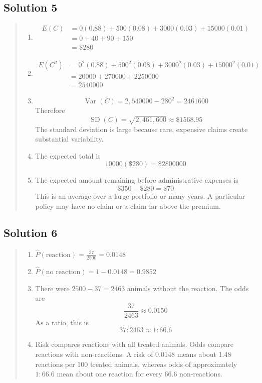 \documentclass[10pt,letterpaper]{article}
\newcommand{\solutionheading}[1]{%
  \subsection*{Solution #1}
}
\newenvironment{answer}{%
  \begin{quote}\small\color{black}
}{%
  \end{quote}
}
\begin{document}
\solutionheading{5}
\begin{answer}
\begin{enumerate}
	\item
	$$
	\begin{aligned}
	E(C) 	&=0(0.88)+500(0.08)+3000(0.03)+15000(0.01)\\
        		&=0+40+90+150\\
  		&=\$280
	\end{aligned}
	$$	
	\item
	$$
	\begin{aligned}
	E(C^2)
	&=0^2(0.88)+500^2(0.08)+3000^2(0.03)+15000^2(0.01)\\
	&=20000+270000+2250000\\
	&=2540000
	\end{aligned}
	 $$
	\item 
	$$\operatorname{Var}(C)=2{,}540000-280^2=2461600$$
	Therefore
	$$\operatorname{SD}(C)=\sqrt{2{,}461{,}600}\approx\$1568.95$$
	The standard deviation is large because rare, expensive claims create substantial variability.
	\item The expected total is
	$$10000(\$280)=\$2800000$$
	\item The expected amount remaining before administrative expenses is
	$$\$350-\$280=\$70$$
	This is an average over a large portfolio or many years. A particular policy may have no claim or a claim far above the premium.
\end{enumerate}
\end{answer}

\solutionheading{6}
\begin{answer}
\begin{enumerate}
	\item $\widehat{P}(\text{reaction})=\frac{37}{2500}=0.0148$	
	\item $\widehat{P}(\text{no reaction})=1-0.0148=0.9852$
  	\item There were $2500-37=2463$ animals without the reaction. The odds are
	$$\frac{37}{2463}\approx0.0150$$
  	As a ratio, this is
	$$37:2463\approx1:66.6$$
  	\item Risk compares reactions with all treated animals. Odds compare reactions with non-reactions. A risk of 0.0148 means about 1.48 reactions per 100 treated animals, whereas odds of approximately $1:66.6$ mean about one reaction for every 66.6 non-reactions.
\end{enumerate}
\end{answer}
\end{document}
